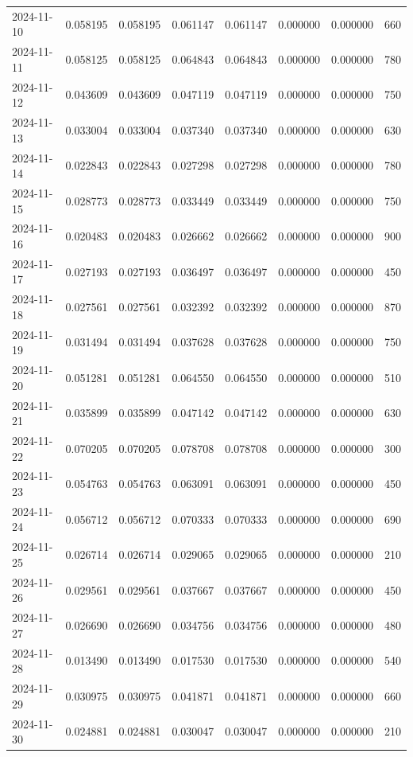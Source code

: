 \begin{tabular}{lrrrrrrr}
2024-11-10 & 0.058195 & 0.058195 & 0.061147 & 0.061147 & 0.000000 & 0.000000 & 660 \\
2024-11-11 & 0.058125 & 0.058125 & 0.064843 & 0.064843 & 0.000000 & 0.000000 & 780 \\
2024-11-12 & 0.043609 & 0.043609 & 0.047119 & 0.047119 & 0.000000 & 0.000000 & 750 \\
2024-11-13 & 0.033004 & 0.033004 & 0.037340 & 0.037340 & 0.000000 & 0.000000 & 630 \\
2024-11-14 & 0.022843 & 0.022843 & 0.027298 & 0.027298 & 0.000000 & 0.000000 & 780 \\
2024-11-15 & 0.028773 & 0.028773 & 0.033449 & 0.033449 & 0.000000 & 0.000000 & 750 \\
2024-11-16 & 0.020483 & 0.020483 & 0.026662 & 0.026662 & 0.000000 & 0.000000 & 900 \\
2024-11-17 & 0.027193 & 0.027193 & 0.036497 & 0.036497 & 0.000000 & 0.000000 & 450 \\
2024-11-18 & 0.027561 & 0.027561 & 0.032392 & 0.032392 & 0.000000 & 0.000000 & 870 \\
2024-11-19 & 0.031494 & 0.031494 & 0.037628 & 0.037628 & 0.000000 & 0.000000 & 750 \\
2024-11-20 & 0.051281 & 0.051281 & 0.064550 & 0.064550 & 0.000000 & 0.000000 & 510 \\
2024-11-21 & 0.035899 & 0.035899 & 0.047142 & 0.047142 & 0.000000 & 0.000000 & 630 \\
2024-11-22 & 0.070205 & 0.070205 & 0.078708 & 0.078708 & 0.000000 & 0.000000 & 300 \\
2024-11-23 & 0.054763 & 0.054763 & 0.063091 & 0.063091 & 0.000000 & 0.000000 & 450 \\
2024-11-24 & 0.056712 & 0.056712 & 0.070333 & 0.070333 & 0.000000 & 0.000000 & 690 \\
2024-11-25 & 0.026714 & 0.026714 & 0.029065 & 0.029065 & 0.000000 & 0.000000 & 210 \\
2024-11-26 & 0.029561 & 0.029561 & 0.037667 & 0.037667 & 0.000000 & 0.000000 & 450 \\
2024-11-27 & 0.026690 & 0.026690 & 0.034756 & 0.034756 & 0.000000 & 0.000000 & 480 \\
2024-11-28 & 0.013490 & 0.013490 & 0.017530 & 0.017530 & 0.000000 & 0.000000 & 540 \\
2024-11-29 & 0.030975 & 0.030975 & 0.041871 & 0.041871 & 0.000000 & 0.000000 & 660 \\
2024-11-30 & 0.024881 & 0.024881 & 0.030047 & 0.030047 & 0.000000 & 0.000000 & 210 \\

\end{tabular}
